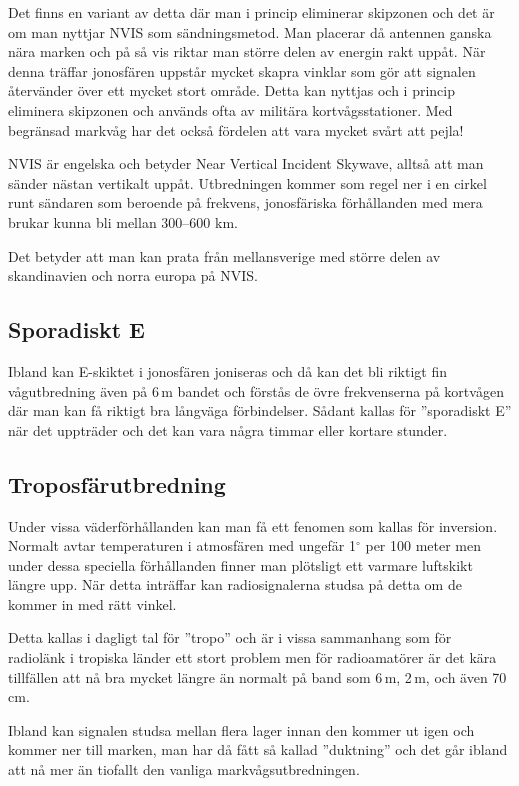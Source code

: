 Det finns en variant av detta där man i princip eliminerar skipzonen och det
är om man nyttjar NVIS som sändningsmetod. Man placerar då antennen ganska
nära marken och på så vis riktar man större delen av energin rakt uppåt. När
denna träffar jonosfären uppstår mycket skapra vinklar som gör att signalen
återvänder över ett mycket stort område. Detta kan nyttjas och i princip
eliminera skipzonen och används ofta av militära kortvågsstationer. Med
begränsad markvåg har det också fördelen att vara mycket svårt att pejla!

NVIS är engelska och betyder Near Vertical Incident Skywave, alltså att man
sänder nästan vertikalt uppåt. Utbredningen kommer som regel ner i en cirkel
runt sändaren som beroende på frekvens, jonosfäriska förhållanden med mera
brukar kunna bli mellan 300--600 km.

Det betyder att man kan prata från mellansverige med större delen av
skandinavien och norra europa på NVIS.

\subsection{Sporadiskt E}

Ibland kan E-skiktet i jonosfären joniseras och då kan det bli riktigt fin
vågutbredning även på 6\,m bandet och förstås de övre frekvenserna på
kortvågen där man kan få riktigt bra långväga förbindelser. Sådant kallas för
''sporadiskt E'' när det uppträder och det kan vara några timmar eller kortare
stunder.

\subsection{Troposfärutbredning}

Under vissa väderförhållanden kan man få ett fenomen som kallas för inversion.
Normalt avtar temperaturen i atmosfären med ungefär 1$^\circ$ per 100 meter
men under dessa speciella förhållanden finner man plötsligt ett varmare
luftskikt längre upp. När detta inträffar kan radiosignalerna studsa på detta
om de kommer in med rätt vinkel.

Detta kallas i dagligt tal för ''tropo'' och är i vissa sammanhang som för
radiolänk i tropiska länder ett stort problem men för radioamatörer är det
kära tillfällen att nå bra mycket längre än normalt på band som 6\,m, 2\,m,
och även 70\,cm.

Ibland kan signalen studsa mellan flera lager innan den kommer ut igen och
kommer ner till marken, man har då fått så kallad ''duktning'' och det går
ibland att nå mer än tiofallt den vanliga markvågsutbredningen.

